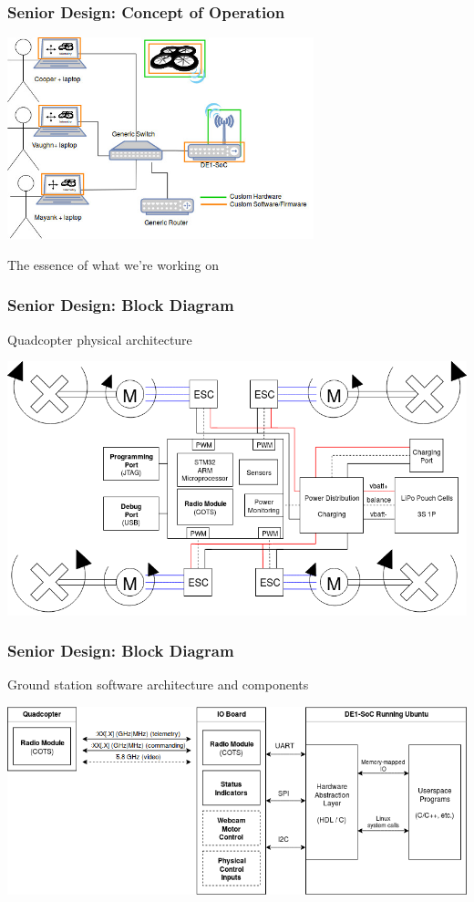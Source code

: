 \documentclass{beamer}
\begin{document}
\begin{frame}
\frametitle{Senior Design: Concept of Operation}
\begin{center}
    \includegraphics[width=3.5in]{assets/senior_design/conops}
\end{center}
    The essence of what we're working on
\end{frame}

\begin{frame}
\frametitle{Senior Design: Block Diagram}
    Quadcopter physical architecture
\begin{center}
    \includegraphics[width=\linewidth]{assets/senior_design/quadcopter}
\end{center}
\end{frame}

\begin{frame}
\frametitle{Senior Design: Block Diagram}
    Ground station software architecture and components
\begin{center}
    \includegraphics[width=\linewidth]{assets/senior_design/ground_station}
\end{center}
\end{frame}
\end{document}
